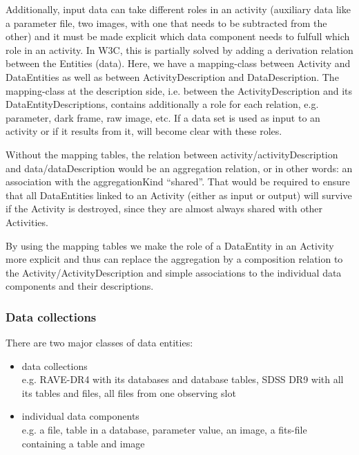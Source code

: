 Additionally, input data can take different roles in an activity (auxiliary data like a parameter file, two images, with one that needs to be subtracted from the other) and it must be made explicit which data component needs to fulfull which role in an activity. 
In W3C, this is partially solved by adding a derivation relation between the Entities (data). Here, we have a mapping-class between Activity and DataEntities as well as between ActivityDescription and DataDescription. The mapping-class at the description side, i.e. between the ActivityDescription and its DataEntityDescriptions, contains additionally a role for each relation, e.g. parameter, dark frame, raw image, etc.  If a data set is used as input to an activity or if it results from it, will become clear with these roles.


Without the mapping tables, the relation between activity/activityDescription and data/dataDescription would be an aggregation relation, or in other words: an association with the aggregationKind ``shared''. That would be required to ensure that all DataEntities linked to an Activity (either as input or output) will survive if the Activity is destroyed, since they are almost always shared with other Activities. 

By using the mapping tables we make the role of a DataEntity in an Activity more explicit and thus can replace the aggregation by a composition relation to the Activity/ActivityDescription and simple associations to the individual data components and their descriptions. 


\subsubsection{Data collections}

There are two major classes of data entities: 

\begin{itemize} 
\item data collections \\e.g. RAVE-DR4 with its databases and database tables, SDSS DR9 with 
all its tables and files, all files from one observing slot\\

\item individual data components\\
e.g. a file, table in a database, parameter value, an image, a fits-file containing a table and image

\end{itemize}


